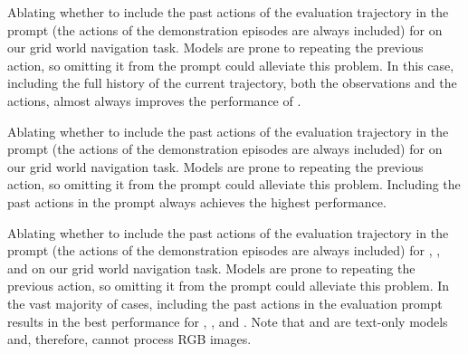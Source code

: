 \begin{table}
    \caption{
        Ablating whether to include the past actions of the evaluation trajectory in the prompt (the actions of the demonstration episodes are always included) for \expflash{} on our grid world navigation task.
        Models are prone to repeating the previous action, so omitting it from the prompt could alleviate this problem.
        In this case, including the full history of the current trajectory, \ie both the observations and the actions, almost always improves the performance of \expflash{}.
    }
    \begin{center}
        \resizebox{0.65\textwidth}{!}{}
    \end{center}
    \label{tab:past-actions-ablation-gemini-flash-exp}
\end{table}

\begin{table}
    \caption{
        Ablating whether to include the past actions of the evaluation trajectory in the prompt (the actions of the demonstration episodes are always included) for \gpt{} on our grid world navigation task.
        Models are prone to repeating the previous action, so omitting it from the prompt could alleviate this problem.
        Including the past actions in the prompt always achieves the highest performance.
    }
    \begin{center}
        \resizebox{0.65\textwidth}{!}{}
    \end{center}
    \label{tab:past-actions-ablation-gpt-4o}
\end{table}

\begin{table}
    \caption{
        Ablating whether to include the past actions of the evaluation trajectory in the prompt (the actions of the demonstration episodes are always included) for \mini{}, \preview{}, and \oone{} on our grid world navigation task.
        Models are prone to repeating the previous action, so omitting it from the prompt could alleviate this problem.
        In the vast majority of cases, including the past actions in the evaluation prompt results in the best performance for \mini{}, \preview{}, and \oone{}.
        Note that \mini{} and \preview{} are text-only models and, therefore, cannot process RGB images.
    }
    \begin{center}
        \resizebox{0.6\textwidth}{!}{}
    \end{center}
    \label{tab:past-actions-ablation-o1}
\end{table}

